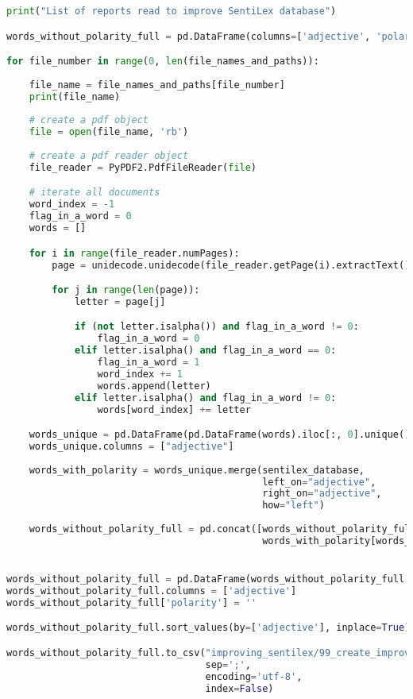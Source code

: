 \begin{lstlisting}[language=Python]
print("List of reports read to improve SentiLex database")

words_without_polarity_full = pd.DataFrame(columns=['adjective', 'polarity'])

for file_number in range(0, len(file_names_and_paths)):
    
    file_name = file_names_and_paths[file_number]
    print(file_name)
    
    # create a pdf object
    file = open(file_name, 'rb')
    
    # create a pdf reader object
    file_reader = PyPDF2.PdfFileReader(file)

    # iterate all documents
    word_index = -1
    flag_in_a_word = 0
    words = []

    for i in range(file_reader.numPages):
        page = unidecode.unidecode(file_reader.getPage(i).extractText().lower())

        for j in range(len(page)):
            letter = page[j]

            if (not letter.isalpha()) and flag_in_a_word != 0:
                flag_in_a_word = 0
            elif letter.isalpha() and flag_in_a_word == 0:
                flag_in_a_word = 1
                word_index += 1
                words.append(letter)
            elif letter.isalpha() and flag_in_a_word != 0:
                words[word_index] += letter

    words_unique = pd.DataFrame(pd.DataFrame(words).iloc[:, 0].unique())
    words_unique.columns = ["adjective"]
    
    words_with_polarity = words_unique.merge(sentilex_database,
                                             left_on="adjective",
                                             right_on="adjective",
                                             how="left")
    
    words_without_polarity_full = pd.concat([words_without_polarity_full,
                                             words_with_polarity[words_with_polarity.polarity.isnull()]])


words_without_polarity_full = pd.DataFrame(words_without_polarity_full.adjective.unique())
words_without_polarity_full.columns = ['adjective']
words_without_polarity_full['polarity'] = ''

words_without_polarity_full.sort_values(by=['adjective'], inplace=True)

words_without_polarity_full.to_csv("improving_sentilex/99_create_improving_sentilex.csv",
                                   sep=';',
                                   encoding='utf-8',
                                   index=False)
\end{lstlisting}

